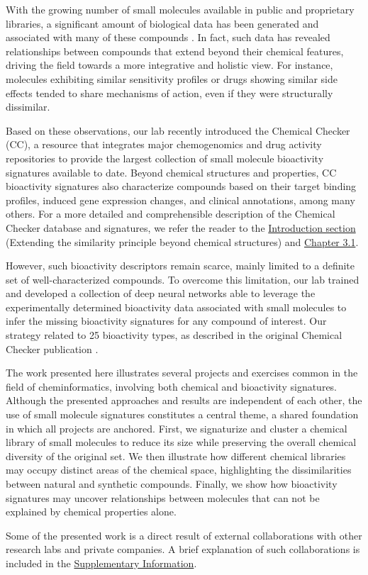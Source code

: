 With the growing number of small molecules available in public and proprietary libraries, a significant amount of biological data has been generated and associated with many of these compounds \cite{zdrazil_chembl_2024, kim_pubchem_2023}. In fact, such data has revealed relationships between compounds that extend beyond their chemical features, driving the field towards a more integrative and holistic view. For instance, molecules exhibiting similar sensitivity profiles or drugs showing similar side effects tended to share mechanisms of action, even if they were structurally dissimilar\cite{campillos_drug_2008}.

Based on these observations, our lab recently introduced the Chemical Checker (CC), a resource that integrates major chemogenomics and drug activity repositories to provide the largest collection of small molecule bioactivity signatures available to date. Beyond chemical structures and properties, CC bioactivity signatures also characterize compounds based on their target binding profiles, induced gene expression changes, and clinical annotations, among many others. For a more detailed and comprehensible description of the Chemical Checker database and signatures, we refer the reader to the \hyperref[Introduction_extending]{Introduction section} (Extending the similarity principle beyond chemical structures) and \hyperref[Chapter_3.1]{Chapter 3.1}. 

However, such bioactivity descriptors remain scarce, mainly limited to a definite set of well-characterized compounds. To overcome this limitation, our lab trained and developed a collection of deep neural networks able to leverage the experimentally determined bioactivity data associated with small molecules to infer the missing bioactivity signatures for any compound of interest\cite{bertoni_bioactivity_2021}. Our strategy related to 25 bioactivity types, as described in the original Chemical Checker publication \cite{duran-frigola_extending_2020}.

The work presented here illustrates several projects and exercises common in the field of cheminformatics, involving both chemical and bioactivity signatures. Although the presented approaches and results are independent of each other, the use of small molecule signatures constitutes a central theme, a shared foundation in which all projects are anchored. First, we signaturize and cluster a chemical library of small molecules to reduce its size while preserving the overall chemical diversity of the original set. We then illustrate how different chemical libraries may occupy distinct areas of the chemical space, highlighting the dissimilarities between natural and synthetic compounds. Finally, we show how bioactivity signatures may uncover relationships between molecules that can not be explained by chemical properties alone. 

Some of the presented work is a direct result of external collaborations with other research labs and private companies. A brief explanation of such collaborations is included in the \hyperref[Navigation_SupplementaryInformation]{Supplementary Information}. 




